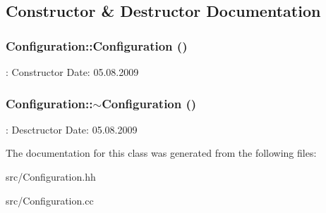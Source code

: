 \subsection{Constructor \& Destructor Documentation}
\hypertarget{classConfiguration_a779947337bf652f0e773cb29f37f14ba}{
\subsubsection[{Configuration}]{\setlength{\rightskip}{0pt plus 5cm}Configuration::Configuration ()}}
\label{classConfiguration_a779947337bf652f0e773cb29f37f14ba}
: Constructor  Date: 05.08.2009 \hypertarget{classConfiguration_a0dd0fa189e239f4c9a036303f641441e}{
\subsubsection[{$\sim$Configuration}]{\setlength{\rightskip}{0pt plus 5cm}Configuration::$\sim$Configuration ()}}
\label{classConfiguration_a0dd0fa189e239f4c9a036303f641441e}
: Desctructor  Date: 05.08.2009 

The documentation for this class was generated from the following files:\begin{DoxyCompactItemize}
\item 
src/Configuration.hh\item 
src/Configuration.cc\end{DoxyCompactItemize}
